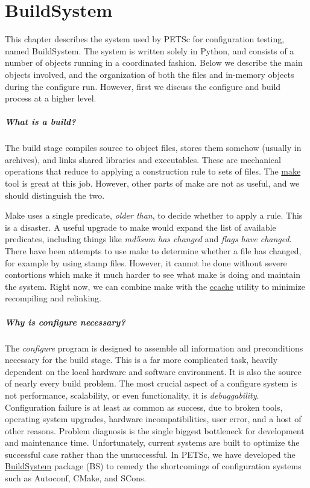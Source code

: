 {{{%
\cleardoublepage
\chapter{BuildSystem}
\label{ch_buildsystem}

This chapter describes the system used by PETSc for configuration testing, named BuildSystem. The system is written solely in Python, and consists of a number of objects running in a coordinated fashion. Below we describe the main objects involved, and the organization of both the files and in-memory objects during the configure run. However, first we discuss the configure and build process at a higher level.

\paragraph{What is a build?} The build stage compiles source to object files, stores them somehow (usually in archives), and links shared libraries and executables. These are mechanical operations that reduce to applying a construction rule to sets of files. The \href{http://www.gnu.org/software/make/}{make} tool is great at this job. However, other parts of make are not as useful, and we should distinguish the two.

Make uses a single predicate, \textit{older than}, to decide whether to apply a rule. This is a disaster. A useful
upgrade to make would expand the list of available predicates, including things like \textit{md5sum has changed} and
\textit{flags have changed}. There have been attempts to use make to determine whether a file has changed, for example
by using stamp files. However, it cannot be done without severe contortions which make it much harder to see what make
is doing and maintain the system. Right now, we can combine make with the \href{https://ccache.samba.org/}{ccache}
utility to minimize recompiling and relinking.

\paragraph{Why is configure necessary?} The \textit{configure} program is designed to assemble all information and preconditions necessary for the build stage. This is a far more complicated task, heavily dependent on the local hardware and software environment. It is also the source of nearly every build problem. The most crucial aspect of a configure system is not performance, scalability, or even functionality, it is \textit{debuggability}. Configuration failure is at least as common as success, due to broken tools, operating system upgrades, hardware incompatibilities, user error, and a host of other reasons. Problem diagnosis is the single biggest bottleneck for development and maintenance time. Unfortunately, current systems are built to optimize the successful case rather than the unsuccessful. In PETSc, we have developed the \href{https://www.bitbucket.org/petsc/BuildSystem}{BuildSystem} package (BS) to remedy the shortcomings of configuration systems such as Autoconf, CMake, and SCons.

}}}

